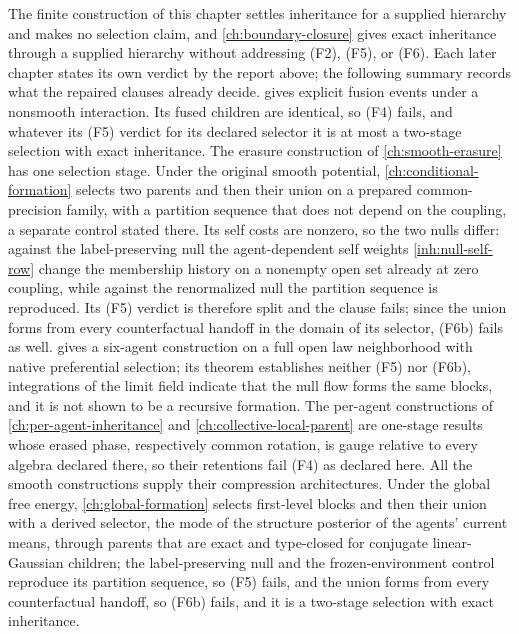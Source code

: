 The finite construction of this chapter settles inheritance for a supplied
hierarchy and makes no selection claim, and \cref{ch:boundary-closure} gives
exact inheritance through a supplied hierarchy without addressing (F2),
(F5), or (F6). Each later chapter states its own verdict by the report above;
the following summary records what the repaired clauses already decide.
 gives explicit fusion events under a nonsmooth interaction.
Its fused children are identical, so (F4) fails, and whatever its (F5)
verdict for its declared selector it is at most a two-stage selection with
exact inheritance. The erasure construction of \cref{ch:smooth-erasure} has
one selection stage. Under the original smooth potential,
\cref{ch:conditional-formation} selects two parents and then their union on a
prepared common-precision family, with a partition sequence that does not
depend on the coupling, a separate control stated there. Its self costs are
nonzero, so the two nulls differ: against the label-preserving null the
agent-dependent self weights \cref{inh:null-self-row} change the membership
history on a nonempty open set already at zero coupling, while against the
renormalized null the partition sequence is reproduced. Its (F5) verdict is
therefore split and the clause fails; since the union forms from every
counterfactual handoff in the domain of its selector, (F6b) fails as well.
 gives a six-agent construction on a full open law
neighborhood with native preferential selection; its theorem establishes
neither (F5) nor (F6b), integrations of the limit field indicate that the
null flow forms the same blocks, and it is not shown to be a recursive
formation. The per-agent constructions of \cref{ch:per-agent-inheritance}
and \cref{ch:collective-local-parent} are one-stage results whose erased
phase, respectively common rotation, is gauge relative to every algebra
declared there, so their retentions fail (F4) as declared here. All the
smooth constructions supply their compression architectures. Under the
global free energy, \cref{ch:global-formation} selects first-level blocks and
then their union with a derived selector, the mode of the structure posterior
of the agents' current means, through parents that are exact and type-closed
for conjugate linear-Gaussian children; the label-preserving null and the
frozen-environment control reproduce its partition sequence, so (F5) fails,
and the union forms from every counterfactual handoff, so (F6b) fails, and
it is a two-stage selection with exact inheritance.

